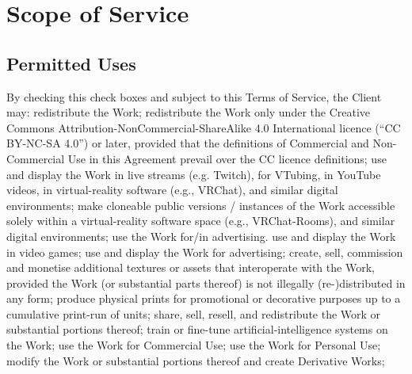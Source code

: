 \section{Scope of Service}


\subsection{Permitted Uses}
By checking this check boxes and subject to this Terms of Service, the Client 
may: 
\newline 
\CheckBox[name=redistribution, width=0.8em, height=0.5em]{}
redistribute the Work; \newline 
\CheckBox[name=redistribution\$, width=0.8em, height=0.5em]{}
redistribute the Work only under the Creative Commons 
Attribution-NonCommercial-ShareAlike 4.0 International licence 
(\enquote{CC BY-NC-SA 4.0}) or later, provided that the definitions of 
Commercial and Non-Commercial Use in this Agreement prevail over the CC licence 
definitions; \newline 
\CheckBox[name=livestreaming, width=0.8em, height=0.5em]{}
use and display the Work in live streams (e.g. Twitch), for VTubing, in YouTube 
videos, in virtual-reality software (e.g., VRChat), and similar digital 
environments; \newline 
\CheckBox[name=vraccess, width=0.8em, height=0.5em]{}
make cloneable public versions / instances of the Work accessible solely within 
a virtual-reality software space (e.g., VRChat-Rooms), and similar digital 
environments; \newline 
\CheckBox[name=videogames, width=0.8em, height=0.5em]{}
use the Work for/in advertising.
use and display the Work in video games; \newline 
\CheckBox[name=advertising, width=0.8em, height=0.5em]{}
use and display the Work for advertising; \newline 
\CheckBox[name=addtional3rdcontent, width=0.8em, height=0.5em]{}
create, sell, commission and monetise additional textures or assets that 
interoperate with the Work, provided the Work (or substantial parts thereof) is 
not illegally (re-)distributed in any form; \newline
\CheckBox[name=printing, width=0.8em, height=0.5em]{}
produce physical prints for promotional or decorative purposes up to a 
cumulative print-run of \docprintrununits{} units; \newline 
\CheckBox[name=selling, width=0.8em, height=0.5em]{}
share, sell, resell, and redistribute the Work or substantial portions thereof; \newline 
\CheckBox[name=AI, width=0.8em, height=0.5em]{}
train or fine-tune artificial-intelligence systems on the Work; \newline 
\CheckBox[name=commercial, width=0.8em, height=0.5em]{}
use the Work for Commercial Use; \newline 
\CheckBox[name=personal, width=0.8em, height=0.5em]{}
use the Work for Personal Use; \newline 
\CheckBox[name=modification, width=0.8em, height=0.5em]{}
modify the Work or substantial portions thereof and create Derivative Works; \newline 



